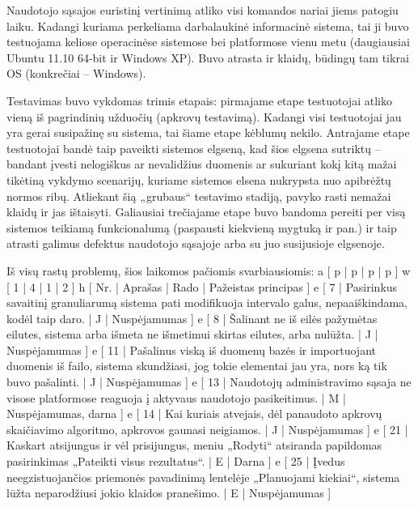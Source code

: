 Naudotojo sąsajos euristinį vertinimą atliko visi komandos nariai jiems patogiu
laiku. Kadangi kuriama perkeliama darbalaukinė informacinė sistema, tai ji buvo
testuojama keliose operacinėse sistemose bei platformose vienu metu
(daugiausiai Ubuntu 11.10 64-bit ir Windows XP). Buvo atrasta ir klaidų,
būdingų tam tikrai OS (konkrečiai – Windows).

Testavimas buvo vykdomas trimis etapais: pirmajame etape testuotojai atliko vieną iš
pagrindinių užduočių (apkrovų testavimą). Kadangi visi testuotojai jau yra gerai susipažinę
su sistema, tai šiame etape kėblumų nekilo. Antrajame etape testuotojai bandė taip paveikti
sistemos elgseną, kad šios elgsena sutriktų – bandant įvesti nelogiškus ar nevalidžius duomenis
ar sukuriant kokį kitą mažai tikėtiną vykdymo scenarijų, kuriame sistemos elsena nukrypsta
nuo apibrėžtų normos ribų. Atliekant šią „grubaus“ testavimo stadiją, pavyko rasti nemažai
klaidų ir jas ištaisyti. Galiausiai trečiajame etape buvo bandoma pereiti per visą sistemos
teikiamą funkcionalumą (paspausti kiekvieną mygtuką ir pan.) ir taip atrasti galimus defektus
naudotojo sąsajoje arba su juo susijusioje elgsenoje.

Iš visų rastų problemų, šios laikomos pačiomis svarbiausiomis:
\xtableu
{
  a [ p | p | p | p ]
  w [ 1 | 4 | 1 | 2 ]
  h [ Nr. | Aprašas | Rado | Pažeistas principas ]
  e [  7  | Pasirinkus savaitinį granuliarumą sistema pati modifikuoja intervalo galus,
  nepaaiškindama, kodėl taip daro. | J | Nuspėjamumas ]
  e [  8  | Šalinant ne iš eilės pažymėtas eilutes, sistema arba išmeta ne išmetimui
  skirtas eilutes, arba nulūžta.  | J | Nuspėjamumas ]
  e [ 11  | Pašalinus viską iš duomenų bazės ir importuojant duomenis iš failo,
  sistema skundžiasi, jog tokie elementai jau yra, nors ką tik buvo pašalinti. | J | Nuspėjamumas ]
  e [ 13  | Naudotojų administravimo sąsaja ne visose platformose reaguoja į
  aktyvaus naudotojo pasikeitimus. | M | Nuspėjamumas, darna ]
  e [ 14  | Kai kuriais atvejais, dėl panaudoto apkrovų skaičiavimo algoritmo,
  apkrovos gaunasi neigiamos. | J | Nuspėjamumas ]
  e [ 21  | Kaskart atsijungus ir vėl prisijungus, meniu „Rodyti“ atsiranda papildomas
    pasirinkimas „Pateikti visus rezultatus“. | E | Darna ]
  e [ 25  | Įvedus neegzistuojančios priemonės pavadinimą lentelėje „Planuojami kiekiai“,
  sistema lūžta neparodžiusi jokio klaidos pranešimo. | E | Nuspėjamumas ]
}

